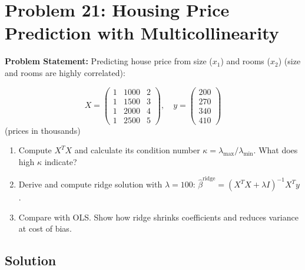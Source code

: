 \documentclass[12pt]{article}
\begin{document}
\newpage
\section{Problem 21: Housing Price Prediction with Multicollinearity}

\textbf{Problem Statement:} Predicting house price from size ($x_1$) and rooms ($x_2$) (size and rooms are highly correlated):

\[
X = \begin{pmatrix}
1 & 1000 & 2 \\
1 & 1500 & 3 \\
1 & 2000 & 4 \\
1 & 2500 & 5
\end{pmatrix}, \quad
y = \begin{pmatrix} 200 \\ 270 \\ 340 \\ 410 \end{pmatrix}
\]
(prices in thousands)

\begin{enumerate}
\item[(a)] Compute $X^TX$ and calculate its condition number $\kappa = \lambda_{\max}/\lambda_{\min}$. What does high $\kappa$ indicate?
\item[(b)] Derive and compute ridge solution with $\lambda = 100$: $\hat{\beta}^{\text{ridge}} = (X^TX + \lambda I)^{-1}X^Ty$.
\item[(c)] Compare with OLS. Show how ridge shrinks coefficients and reduces variance at cost of bias.
\end{enumerate}

\subsection*{Solution}
\end{document}
